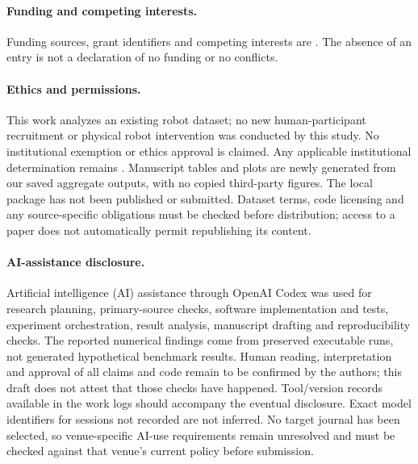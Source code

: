 \paragraph{Funding and competing interests.}
Funding sources, grant identifiers and competing interests are . The absence of an entry is not a declaration of no funding or no conflicts.

\paragraph{Ethics and permissions.}
This work analyzes an existing robot dataset; no new human-participant recruitment or physical robot intervention was conducted by this study. No institutional exemption or ethics approval is claimed. Any applicable institutional determination remains . Manuscript tables and plots are newly generated from our saved aggregate outputs, with no copied third-party figures. The local package has not been published or submitted. Dataset terms, code licensing and any source-specific obligations must be checked before distribution; access to a paper does not automatically permit republishing its content.

\paragraph{AI-assistance disclosure.}
Artificial intelligence (AI) assistance through OpenAI Codex was used for research planning, primary-source checks, software implementation and tests, experiment orchestration, result analysis, manuscript drafting and reproducibility checks. The reported numerical findings come from preserved executable runs, not generated hypothetical benchmark results. Human reading, interpretation and approval of all claims and code remain to be confirmed by the authors; this draft does not attest that those checks have happened. Tool/version records available in the work logs should accompany the eventual disclosure. Exact model identifiers for sessions not recorded are not inferred. No target journal has been selected, so venue-specific AI-use requirements remain unresolved and must be checked against that venue's current policy before submission.
